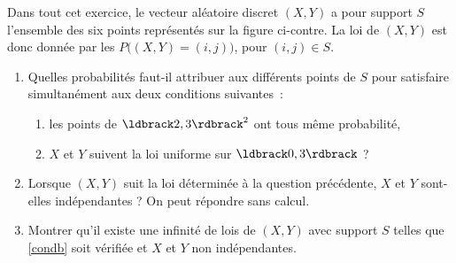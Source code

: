 \documentclass[a4paper,12pt,reqno]{amsart}
\begin{document}
\begin{exo}

  \begin{minipage}{.77\linewidth}
  Dans tout cet exercice, le vecteur aléatoire discret $(X,Y)$ a pour support $S$ l'ensemble des six points représentés sur la figure ci-contre.
  La loi de $(X,Y)$ est donc donnée par les $P\big((X,Y)=(i,j)\big)$, pour $(i,j)\in S$.
  \end{minipage}%
  \begin{minipage}{.21\linewidth}
    \hfill
  \end{minipage}
    \begin{enumerate}
      \item Quelles probabilités faut-il attribuer aux différents points de $S$ pour satisfaire simultanément aux deux conditions suivantes~:
      \begin{enumerate}
        \item\label{conda} les points de $\iintv{2,3}^2$ ont tous même probabilité,
        \item\label{condb} $X$ et $Y$ suivent la loi uniforme sur $\iintv{0,3}$ ?
      \end{enumerate}
      \item Lorsque $(X,Y)$ suit la loi déterminée à la question précédente, $X$ et $Y$ sont-elles indépendantes ? On peut répondre sans calcul.
      \item Montrer qu'il existe une infinité de lois de $(X,Y)$ avec support $S$ telles que \ref{condb} soit vérifiée et $X$ et $Y$ non indépendantes.
    \end{enumerate}

\end{exo}
\end{document}
